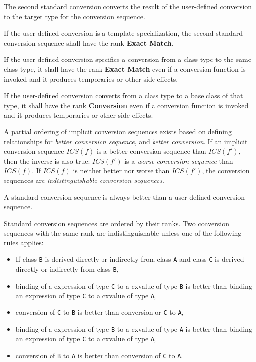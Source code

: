 \p The second standard conversion converts the result of the user-defined
conversion to the target type for the conversion sequence.

\p If the user-defined conversion is a template specialization, the second standard
conversion sequence shall have the rank \textbf{Exact Match}.

\p If the user-defined conversion specifies a conversion from a class type to the
same class type, it shall have the rank \textbf{Exact Match} even if a conversion
function is invoked and it produces temporaries or other side-effects.

\p If the user-defined conversion converts from a class type to a base class of
that type, it shall have the rank \textbf{Conversion} even if a conversion function
is invoked and it produces temporaries or other side-effects.


\p A partial ordering of implicit conversion sequences exists based on defining
relationships for \textit{better conversion sequence}, and \textit{better conversion}. If an
implicit conversion sequence $ICS(f)$ is a better conversion sequence than
$ICS(f\prime)$, then the inverse is also true: $ICS(f\prime)$ is a \textit{worse conversion
sequence} than $ICS(f)$. If $ICS(f)$ is neither better nor worse than
$ICS(f\prime)$, the conversion sequences are \textit{indistinguishable conversion
sequences}.

\p A standard conversion sequence is always better than a user-defined conversion
sequence.

\p Standard conversion sequences are ordered by their ranks. Two conversion
sequences with the same rank are indistinguishable unless one of the following
rules applies:

\begin{itemize}
  \item If class \texttt{B} is derived directly or indirectly from class
  \texttt{A} and class \texttt{C} is derived directly or indirectly from class
  \texttt{B},
  \item binding of a expression of type \texttt{C} to a cxvalue of type
    \texttt{B} is better than binding an expression of type \texttt{C} to a
    cxvalue of type \texttt{A},
  \item conversion of \texttt{C} to \texttt{B} is better than conversion or
    \texttt{C} to \texttt{A},
  \item binding of a expression of type \texttt{B} to a cxvalue of type
    \texttt{A} is better than binding an expression of type \texttt{C} to a
    cxvalue of type \texttt{A},
  \item conversion of \texttt{B} to \texttt{A} is better than conversion of
    \texttt{C} to \texttt{A}.
\end{itemize}


